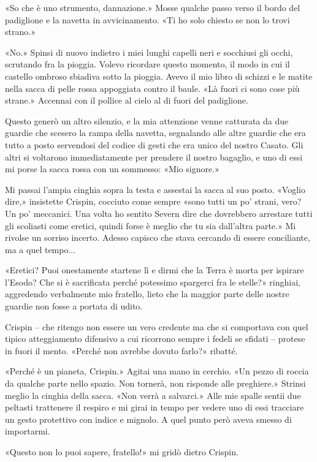 «So che è uno strumento, dannazione.» Mosse qualche passo verso il bordo
del padiglione e la navetta in avvicinamento. «Ti ho solo chiesto se non
lo trovi strano.»

«No.» Spinsi di nuovo indietro i miei lunghi capelli neri e socchiusi
gli occhi, scrutando fra la pioggia. Volevo ricordare questo momento, il
modo in cui il castello ombroso sbiadiva sotto la pioggia. Avevo il mio
libro di schizzi e le matite nella sacca di pelle rossa appoggiata
contro il baule. «Là fuori ci sono cose più strane.» Accennai con il
pollice al cielo al di fuori del padiglione.

Questo generò un altro silenzio, e la mia attenzione venne catturata da
due guardie che scesero la rampa della navetta, segnalando alle altre
guardie che era tutto a posto servendosi del codice di gesti che era
unico del nostro Casato. Gli altri si voltarono immediatamente per
prendere il nostro bagaglio, e uno di essi mi porse la sacca rossa con
un sommesso: «Mio signore.»

Mi passai l'ampia cinghia sopra la testa e assestai la sacca al suo
posto. «Voglio dire,» insistette Crispin, cocciuto come sempre «sono
tutti un po' strani, vero? Un po' meccanici. Una volta ho sentito Severn
dire che dovrebbero arrestare tutti gli scoliasti come eretici, quindi
forse è meglio che tu sia dall'altra parte.» Mi rivolse un sorriso
incerto. Adesso capisco che stava cercando di essere conciliante, ma a
quel tempo...

«Eretici? Puoi onestamente startene lì e dirmi che la Terra è morta per
ispirare l'Esodo? Che si è sacrificata perché potessimo spargerci fra le
stelle?» ringhiai, aggredendo verbalmente mio fratello, lieto che la
maggior parte delle nostre guardie non fosse a portata di udito.

Crispin -- che ritengo non essere un vero credente ma che si comportava
con quel tipico atteggiamento difensivo a cui ricorrono sempre i fedeli
se sfidati -- protese in fuori il mento. «Perché non avrebbe dovuto
farlo?» ribatté.

«Perché è un pianeta, Crispin.» Agitai una mano in cerchio. «Un pezzo di
roccia da qualche parte nello spazio. Non tornerà, non risponde alle
preghiere.» Strinsi meglio la cinghia della sacca. «Non verrà a
salvarci.» Alle mie spalle sentii due peltasti trattenere il respiro e
mi girai in tempo per vedere uno di essi tracciare un gesto protettivo
con indice e mignolo. A quel punto però aveva smesso di importarmi.

«Questo non lo puoi sapere, fratello!» mi gridò dietro Crispin.

